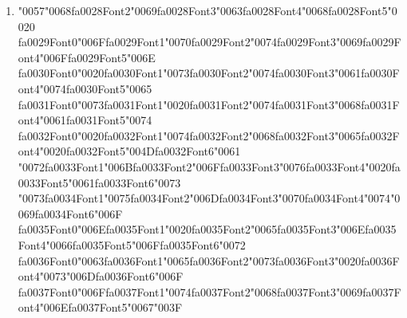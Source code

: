\documentclass[12pt]{article}
\begin{document}
\begin{enumerate}[label=Q\arabic*.]
 \begin{enumerate}[label=(\Alph*)]
     \item The hidden state has fixed dimensionality
     \item They reuse identical parameters at every time step
     \item Gradients decay or explode during backpropagation
     \item They produce outputs only at the final step
 \end{enumerate}
 
 \item {\char"0057}{\char"0068}{\csname fa0028Font2\endcsname\char"0069}{\csname fa0028Font3\endcsname\char"0063}{\csname fa0028Font4\endcsname\char"0068}{\csname fa0028Font5\endcsname\char"0020} {\csname fa0029Font0\endcsname\char"006F}{\csname fa0029Font1\endcsname\char"0070}{\csname fa0029Font2\endcsname\char"0074}{\csname fa0029Font3\endcsname\char"0069}{\csname fa0029Font4\endcsname\char"006F}{\csname fa0029Font5\endcsname\char"006E} {\csname fa0030Font0\endcsname\char"0020}{\csname fa0030Font1\endcsname\char"0073}{\csname fa0030Font2\endcsname\char"0074}{\csname fa0030Font3\endcsname\char"0061}{\csname fa0030Font4\endcsname\char"0074}{\csname fa0030Font5\endcsname\char"0065} {\csname fa0031Font0\endcsname\char"0073}{\csname fa0031Font1\endcsname\char"0020}{\csname fa0031Font2\endcsname\char"0074}{\csname fa0031Font3\endcsname\char"0068}{\csname fa0031Font4\endcsname\char"0061}{\csname fa0031Font5\endcsname\char"0074} {\csname fa0032Font0\endcsname\char"0020}{\csname fa0032Font1\endcsname\char"0074}{\csname fa0032Font2\endcsname\char"0068}{\csname fa0032Font3\endcsname\char"0065}{\csname fa0032Font4\endcsname\char"0020}{\csname fa0032Font5\endcsname\char"004D}{\csname fa0032Font6\endcsname\char"0061} {\char"0072}{\csname fa0033Font1\endcsname\char"006B}{\csname fa0033Font2\endcsname\char"006F}{\csname fa0033Font3\endcsname\char"0076}{\csname fa0033Font4\endcsname\char"0020}{\csname fa0033Font5\endcsname\char"0061}{\csname fa0033Font6\endcsname\char"0073} {\char"0073}{\csname fa0034Font1\endcsname\char"0075}{\csname fa0034Font2\endcsname\char"006D}{\csname fa0034Font3\endcsname\char"0070}{\csname fa0034Font4\endcsname\char"0074}{\char"0069}{\csname fa0034Font6\endcsname\char"006F} {\csname fa0035Font0\endcsname\char"006E}{\csname fa0035Font1\endcsname\char"0020}{\csname fa0035Font2\endcsname\char"0065}{\csname fa0035Font3\endcsname\char"006E}{\csname fa0035Font4\endcsname\char"0066}{\csname fa0035Font5\endcsname\char"006F}{\csname fa0035Font6\endcsname\char"0072} {\csname fa0036Font0\endcsname\char"0063}{\csname fa0036Font1\endcsname\char"0065}{\csname fa0036Font2\endcsname\char"0073}{\csname fa0036Font3\endcsname\char"0020}{\csname fa0036Font4\endcsname\char"0073}{\char"006D}{\csname fa0036Font6\endcsname\char"006F} {\csname fa0037Font0\endcsname\char"006F}{\csname fa0037Font1\endcsname\char"0074}{\csname fa0037Font2\endcsname\char"0068}{\csname fa0037Font3\endcsname\char"0069}{\csname fa0037Font4\endcsname\char"006E}{\csname fa0037Font5\endcsname\char"0067}{\char"003F}

\end{enumerate}
\end{document}
